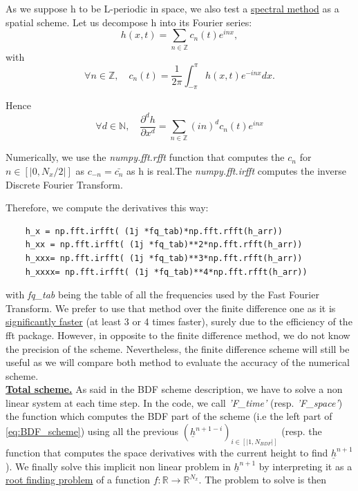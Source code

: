 \documentclass[12pt]{article}
\begin{document}
\vspace{0.5cm}

As we suppose h to be L-periodic in space, we also test a \underline{spectral method} as a spatial scheme. Let
 us decompose h into its Fourier series: $$h(x, t) = \sum_{n\in \mathbb{Z}} c_n(t)e^{inx},$$
with $$\forall n \in \mathbb{Z}, \quad c_n(t) = \frac{1}{2\pi}\int_{-\pi}^{\pi}h(x,t) e^{-inx}dx.$$

Hence $$\forall d \in \mathbb{N},\quad \frac{\partial^d h}{\partial x^d} = \sum_{n\in \mathbb{Z}} (in)^dc_n(t)e^{inx}$$ 

Numerically, we use the \textit{numpy.fft.rfft} function that computes the $c_n$ for $n\in [|0,N_x/2|]$ as $c_{-n} = \bar{c_n}$ as h is real.The \textit{numpy.fft.irfft} computes the inverse Discrete Fourier Transform.

Therefore, we compute the derivatives this way:
\begin{verbatim}
    h_x = np.fft.irfft( (1j *fq_tab)*np.fft.rfft(h_arr))
    h_xx = np.fft.irfft( (1j *fq_tab)**2*np.fft.rfft(h_arr))
    h_xxx= np.fft.irfft( (1j *fq_tab)**3*np.fft.rfft(h_arr))
    h_xxxx= np.fft.irfft( (1j *fq_tab)**4*np.fft.rfft(h_arr))
\end{verbatim}
with \textit{fq\_tab} being the table of all the frequencies used by the Fast Fourier Transform. 
We prefer to use that method over the finite difference one as it is \underline{significantly faster} (at least 3 or 4 times faster), surely due to the efficiency of the fft package. However, in opposite to the finite difference method, we do not know the precision of the scheme. 
Nevertheless, the finite difference scheme will still be useful as we will compare both method to evaluate the accuracy of the numerical scheme. 
\\

\underline{\textbf{Total scheme.}} As said in the BDF scheme description, we have to solve a non linear system at each time step. In the code, we call \textit{'F\_time'} (resp. \textit{'F\_space'}) the function which computes the BDF part 
of the scheme (i.e the left part of \eqref{eq:BDF_scheme}) using all the previous $(\underline{h}^{n+1-i})_{i\in [|1, N_{BDF}|]}$  (resp. the function that computes the space derivatives with the current height to find $\underline{h}^{n+1}$ ).
We finally solve this implicit non linear problem in $\underline{h}^{n+1}$  by interpreting it as a \underline{root finding problem} of a function $f:\mathbb{R}\rightarrow \mathbb{R}^{N_x}$. The problem to solve is then 
\end{document}
